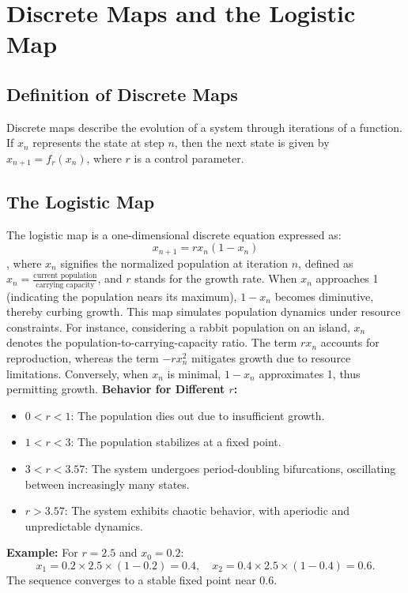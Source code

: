 \documentclass{article}
\begin{document}
\section{Discrete Maps and the Logistic Map}

\subsection{Definition of Discrete Maps}
Discrete maps describe the evolution of a system through iterations of a function. If $x_n$ represents the state at step $n$, then the next state is given by $x_{n+1} = f_r(x_n)$, where $r$ is a control parameter.

\subsection{The Logistic Map}
The logistic map is a one-dimensional discrete equation expressed as: $$ x_{n+1} = r x_n (1 - x_n) $$, where \( x_n \) signifies the normalized population at iteration \( n \), defined as \( x_n = \frac{\text{current population}}{\text{carrying capacity}} \), and \( r \) stands for the growth rate. When \( x_n \) approaches 1 (indicating the population nears its maximum), \( 1 - x_n \) becomes diminutive, thereby curbing growth. This map simulates population dynamics under resource constraints. For instance, considering a rabbit population on an island, \( x_n \) denotes the population-to-carrying-capacity ratio. The term \( r x_n \) accounts for reproduction, whereas the term \( - r x_n^2 \) mitigates growth due to resource limitations. Conversely, when \( x_n \) is minimal, \( 1 - x_n \) approximates 1, thus permitting growth.
\textbf{Behavior for Different \( r \):}
        \begin{itemize}
            \item \( 0 < r < 1 \): The population dies out due to insufficient growth.
            \item \( 1 < r < 3 \): The population stabilizes at a fixed point.
            \item \( 3 < r < 3.57 \): The system undergoes period-doubling bifurcations, oscillating between increasingly many states.
            \item \( r > 3.57 \): The system exhibits chaotic behavior, with aperiodic and unpredictable dynamics.
        \end{itemize}
\textbf{Example:}
        For \( r = 2.5 \) and \( x_0 = 0.2 \):
        \[
        x_1 = 0.2 \times 2.5 \times (1 - 0.2) = 0.4, \quad
        x_2 = 0.4 \times 2.5 \times (1 - 0.4) = 0.6.
        \]
        The sequence converges to a stable fixed point near 0.6.
\end{document}
